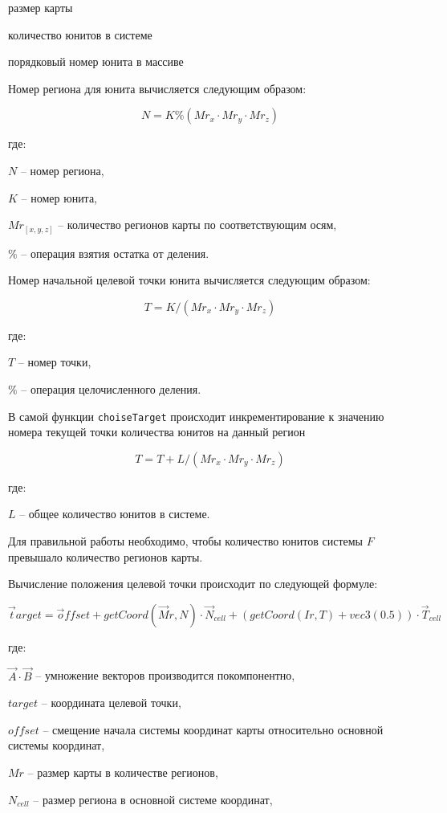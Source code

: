 \begin{mintemize}
\item размер карты
\item количество юнитов в системе
\item порядковый номер юнита в массиве
\end{mintemize}

Номер региона для юнита вычисляется следующим образом:

$$N = K \% ( Mr_x \cdot Mr_y \cdot Mr_z ) $$

где:

$N$ -- номер региона,

$K$ -- номер юнита,

$Mr_{[x,y,z]}$ -- количество регионов карты по соответствующим осям,

$\%$ -- операция взятия остатка от деления.

Номер начальной целевой точки юнита вычисляется следующим образом:

$$T = K / ( Mr_x \cdot Mr_y \cdot Mr_z )$$

где:

$T$ -- номер точки,

$\%$ -- операция целочисленного деления.

В самой функции \verb|choiseTarget| происходит инкрементирование к
значению номера текущей точки количества юнитов на данный регион

$$T = T + L / ( Mr_x \cdot Mr_y \cdot Mr_z )$$

где:

$L$ -- общее количество юнитов в системе.

Для правильной работы необходимо, чтобы количество юнитов системы $F$ превышало
количество регионов карты.

Вычисление положения целевой точки происходит по следующей формуле:

$$ \vec target = \vec offset + getCoord( \vec Mr, N ) \cdot \vec N_{cell} + ( getCoord( Ir, T ) + vec3(0.5) ) \cdot \vec T_{cell} $$

где:

$\vec A \cdot \vec B$ -- умножение векторов производится покомпонентно,

$target$ -- координата целевой точки,

$offset$ -- смещение начала системы координат карты относительно основной
    системы координат,

$Mr$ -- размер карты в количестве регионов,

$N_{cell}$ -- размер региона в основной системе координат,

